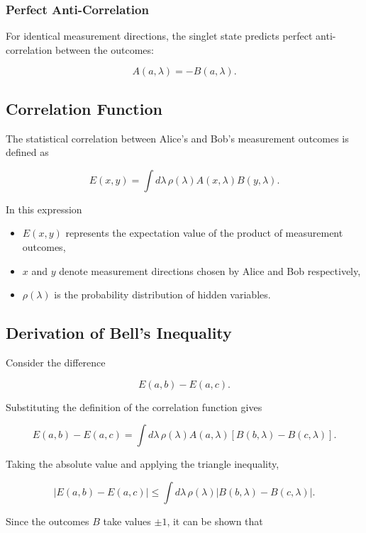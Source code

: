 \documentclass[17pt,a4paper]{extarticle}
\begin{document}
\subsubsection{Perfect Anti-Correlation}

For identical measurement directions, the singlet state predicts perfect anti-correlation between the outcomes:

\[
A(a,\lambda) = -B(a,\lambda).
\]


\subsection{Correlation Function}

The statistical correlation between Alice’s and Bob’s measurement outcomes is defined as

\[
E(x,y) =
\int d\lambda \, \rho(\lambda) A(x,\lambda) B(y,\lambda).
\]

In this expression

\begin{itemize}
\item $E(x,y)$ represents the expectation value of the product of measurement outcomes,
\item $x$ and $y$ denote measurement directions chosen by Alice and Bob respectively,
\item $\rho(\lambda)$ is the probability distribution of hidden variables.
\end{itemize}


\subsection{Derivation of Bell's Inequality}

Consider the difference

\[
E(a,b) - E(a,c).
\]

Substituting the definition of the correlation function gives

\[
E(a,b) - E(a,c)
=
\int d\lambda \, \rho(\lambda)
A(a,\lambda)
\left[
B(b,\lambda) - B(c,\lambda)
\right].
\]

Taking the absolute value and applying the triangle inequality,

\[
|E(a,b) - E(a,c)|
\le
\int d\lambda \, \rho(\lambda)
|B(b,\lambda) - B(c,\lambda)|.
\]

Since the outcomes $B$ take values $\pm1$, it can be shown that
\end{document}
